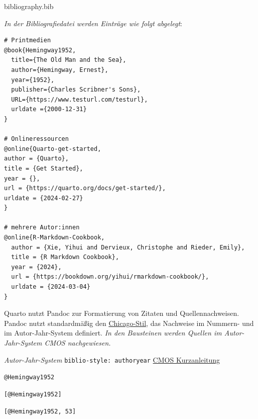 \documentclass[
  letterpaper,
  DIV=11]{scrartcl}
\providecommand{\tightlist}{%
  \setlength{\itemsep}{0pt}\setlength{\parskip}{0pt}}\usepackage{longtable,booktabs,array}
\begin{document}
\begin{description}
\tightlist
\item[Bibliografiedatei]
bibliography.bib
\end{description}

\emph{In der Bibliografiedatei werden Einträge wie folgt abgelegt}:

\begin{verbatim}
# Printmedien
@book{Hemingway1952,
  title={The Old Man and the Sea},
  author={Hemingway, Ernest},
  year={1952},
  publisher={Charles Scribner's Sons},
  URL={https://www.testurl.com/testurl},
  urldate ={2000-12-31}
}

# Onlineressourcen
@online{Quarto-get-started,
author = {Quarto},
title = {Get Started},
year = {},
url = {https://quarto.org/docs/get-started/},
urldate = {2024-02-27}
}

# mehrere Autor:innen
@online{R-Markdown-Cookbook,
  author = {Xie, Yihui and Dervieux, Christophe and Rieder, Emily},
  title = {R Markdown Cookbook},
  year = {2024},
  url = {https://bookdown.org/yihui/rmarkdown-cookbook/},
  urldate = {2024-03-04}
}
\end{verbatim}

Quarto nutzt Pandoc zur Formatierung von Zitaten und Quellennachweisen.
Pandoc nutzt standardmäßig den
\href{https://www.chicagomanualofstyle.org/tools_citationguide.html}{Chicago-Stil},
das Nachweise im Nummern- und im Autor-Jahr-System definiert. \emph{In
den Bausteinen werden Quellen im Autor-Jahr-System CMOS nachgewiesen.}

\begin{description}
\tightlist
\item[Zitierstil]
\emph{Autor-Jahr-System} \texttt{biblio-style:\ authoryear}
\href{https://www.scribbr.com/chicago-style/author-date/}{CMOS
Kurzanleitung}

\texttt{@Hemingway1952} \textcite{Hemingway1952}

\texttt{{[}@Hemingway1952{]}} \autocite{Hemingway1952}

\texttt{{[}@Hemingway1952,\ 53{]}} \autocite[53]{Hemingway1952}
\end{description}

~
\end{document}
